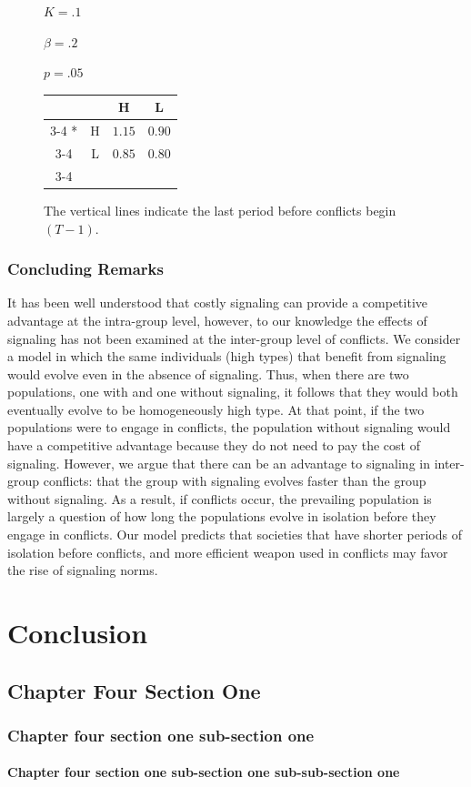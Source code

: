 \begin{figure}[p]
\begin{minipage}[c]{.2\textwidth}
    $K = .1$
    
    $\beta = .2$

    $p = .05$
    \end{minipage}\hfill
  \begin{minipage}[c]{.3\textwidth}
  \begin{tabular}{cc|c|c|}
      & \multicolumn{1}{c}{} & \multicolumn{1}{c}{H}  & \multicolumn{1}{c}{L} \\\cline{3-4}
      \multirow{2}*{}  & H & $1.15$ & $0.90$ \\\cline{3-4}
      & L & $0.85$ & $0.80$ \\\cline{3-4}
    \end{tabular}
    \end{minipage}\hfill
    \begin{minipage}[c]{.3\textwidth}
    The vertical lines indicate the last period before conflicts begin $(T-1)$.
    \end{minipage}
    \end{figure} 


\subsection{Concluding Remarks}

It has been well understood that costly signaling can provide a competitive advantage at the intra-group level, however, to our knowledge the effects of signaling has not been examined at the inter-group level of conflicts. We consider a model in which the same individuals (high types) that benefit from signaling would evolve even in the absence of signaling. Thus, when there are two populations, one with and one without signaling, it follows that they would both eventually evolve to be homogeneously high type. At that point, if the two populations were to engage in conflicts, the population without signaling would have a competitive advantage because they do not need to pay the cost of signaling. However, we argue that there can be an advantage to signaling in inter-group conflicts: that the group with signaling evolves faster than the group without signaling. As a result, if conflicts occur, the prevailing population is largely a question of how long the populations evolve in isolation before they engage in conflicts. Our model predicts that societies that have shorter periods of isolation before conflicts, and more efficient weapon used in conflicts may favor the rise of signaling norms. 


\chapter{Conclusion}
\section{Chapter Four Section One}
\subsection{Chapter four section one sub-section one}
\subsubsection{Chapter four section one sub-section one sub-sub-section one}

